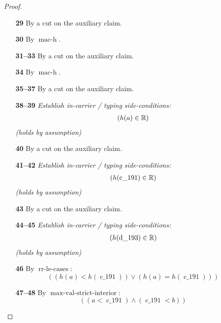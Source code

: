 \documentclass[11pt]{article}
\theoremstyle{plain}
\begin{document}
\begin{proof}
\begin{itemize}[leftmargin=2.8em, itemsep=4pt, parsep=1pt]
  \item[\textbf{29}] By a cut on the auxiliary claim.
  \item[\textbf{30}] By $\operatorname{mac\text{-}h}$.
  \item[\textbf{31--33}] By a cut on the auxiliary claim.
  \item[\textbf{34}] By $\operatorname{mac\text{-}h}$.
  \item[\textbf{35--37}] By a cut on the auxiliary claim.
  \item[\textbf{38--39}] \emph{Establish in-carrier / typing side-conditions:}
\begin{equation*}
\begin{array}{@{}l@{}}
(h(a) \in \mathbb{R})
\end{array}
\end{equation*}
  \emph{(holds by assumption)}
  \item[\textbf{40}] By a cut on the auxiliary claim.
  \item[\textbf{41--42}] \emph{Establish in-carrier / typing side-conditions:}
\begin{equation*}
\begin{array}{@{}l@{}}
(h(\operatorname{c\_191}) \in \mathbb{R})
\end{array}
\end{equation*}
  \emph{(holds by assumption)}
  \item[\textbf{43}] By a cut on the auxiliary claim.
  \item[\textbf{44--45}] \emph{Establish in-carrier / typing side-conditions:}
\begin{equation*}
\begin{array}{@{}l@{}}
(h(\operatorname{d\_193}) \in \mathbb{R})
\end{array}
\end{equation*}
  \emph{(holds by assumption)}
  \item[\textbf{46}] By $\operatorname{rr\text{-}le\text{-}cases}$:
\begin{equation*}
((h(a) < h(\operatorname{c\_191})) \vee (h(a) = h(\operatorname{c\_191})))
\end{equation*}

  \item[\textbf{47--48}] By $\operatorname{max\text{-}val\text{-}strict\text{-}interior}$:
\begin{equation*}
((a < \operatorname{c\_191}) \wedge (\operatorname{c\_191} < b))
\end{equation*}


\end{itemize}
\end{proof}
\end{document}
